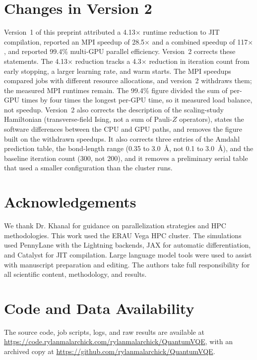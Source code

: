 \documentclass[11pt]{article}
\begin{document}
\section*{Changes in Version 2}

Version~1 of this preprint attributed a 4.13$\times$ runtime reduction to JIT compilation, reported an MPI speedup of 28.5$\times$ and a combined speedup of 117$\times$, and reported 99.4\% multi-GPU parallel efficiency. Version~2 corrects these statements. The 4.13$\times$ reduction tracks a 4.3$\times$ reduction in iteration count from early stopping, a larger learning rate, and warm starts. The MPI speedups compared jobs with different resource allocations, and version~2 withdraws them; the measured MPI runtimes remain. The 99.4\% figure divided the sum of per-GPU times by four times the longest per-GPU time, so it measured load balance, not speedup. Version~2 also corrects the description of the scaling-study Hamiltonian (transverse-field Ising, not a sum of Pauli-$Z$ operators), states the software differences between the CPU and GPU paths, and removes the figure built on the withdrawn speedups. It also corrects three entries of the Amdahl prediction table, the bond-length range (0.35 to 3.0~\AA, not 0.1 to 3.0~\AA), and the baseline iteration count (300, not 200), and it removes a preliminary serial table that used a smaller configuration than the cluster runs.

\section*{Acknowledgements}

We thank Dr. Khanal for guidance on parallelization strategies and HPC methodologies. This work used the ERAU Vega HPC cluster. The simulations used PennyLane with the Lightning backends, JAX for automatic differentiation, and Catalyst for JIT compilation. Large language model tools were used to assist with manuscript preparation and editing. The authors take full responsibility for all scientific content, methodology, and results.

\section*{Code and Data Availability}

The source code, job scripts, logs, and raw results are available at \url{https://code.rylanmalarchick.com/rylanmalarchick/QuantumVQE}, with an archived copy at \url{https://github.com/rylanmalarchick/QuantumVQE}.
\end{document}
